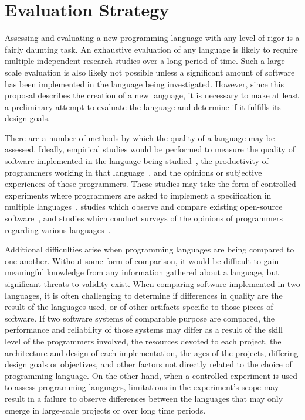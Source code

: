 \documentclass[11pt]{article}
\theoremstyle{break}
\begin{document}
\vspace*{-.2in}
\section{Evaluation Strategy}
\label{sec:evaluate}
\vspace*{-.1in}

Assessing and evaluating a new programming language with any level of rigor is a fairly daunting task. An exhaustive evaluation of any language is likely to require multiple independent research studies over a long period of time. Such a large-scale evaluation is also likely not possible unless a significant amount of software has been implemented in the language being investigated. However, since this proposal describes the creation of a new language, it is necessary to make at least a preliminary attempt to evaluate the language and determine if it fulfills its design goals.

There are a number of methods by which the quality of a language may be assessed. Ideally, empirical studies would be performed to measure the quality of software implemented in the language being studied~\cite{Bhattacharya:2011:APL:1985793.1985817,Ray:2014:LSS:2635868.2635922}, the productivity of programmers working in that language~\cite{hudak1994haskell}, and the opinions or subjective experiences of those programmers. These studies may take the form of controlled experiments where programmers are asked to implement a specification in multiple languages~\cite{hudak1994haskell,Ray:2014:LSS:2635868.2635922}, studies which observe and compare existing open-source software~\cite{Ray:2014:LSS:2635868.2635922,Bhattacharya:2011:APL:1985793.1985817}, and studies which conduct surveys of the opinions of programmers regarding various languages~\cite{Ray:2014:LSS:2635868.2635922}.

Additional difficulties arise when programming languages are being compared to one another. Without some form of comparison, it would be difficult to gain meaningful knowledge from any information gathered about a language, but significant threats to validity exist. When comparing software implemented in two languages, it is often challenging to determine if differences in quality are the result of the languages used, or of other artifacts specific to those pieces of software. If two software systems of comparable purpose are compared, the performance and reliability of those systems may differ as a result of the skill level of the programmers involved, the resources devoted to each project, the architecture and design of each implementation, the ages of the projects, differing design goals or objectives, and other factors not directly related to the choice of programming language. On the other hand, when a controlled experiment is used to assess programming languages, limitations in the experiment's scope may result in a failure to observe differences between the languages that may only emerge in large-scale projects or over long time periods.
\end{document}

